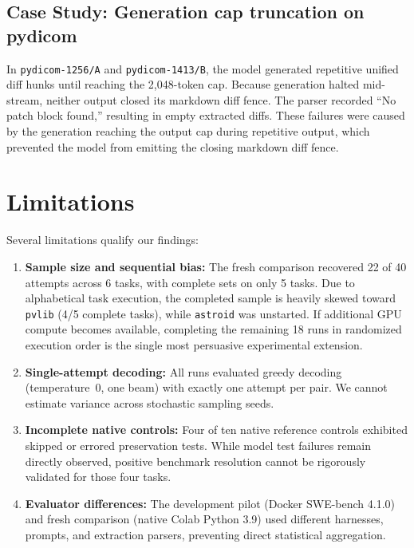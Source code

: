 \documentclass[11pt]{article}
\begin{document}
\subsection{Case Study: Generation cap truncation on pydicom}

In \texttt{pydicom-1256/A} and \texttt{pydicom-1413/B}, the model generated
repetitive unified diff hunks until reaching the 2{,}048-token cap.
Because generation halted mid-stream, neither output closed its markdown
diff fence.  The parser recorded ``No patch block found,'' resulting in
empty extracted diffs.  These failures were caused by the generation reaching
the output cap during repetitive output, which prevented the model from
emitting the closing markdown diff fence.

\section{Limitations}

Several limitations qualify our findings:
\begin{enumerate}[nosep]
  \item \textbf{Sample size and sequential bias:} The fresh comparison
    recovered 22 of 40 attempts across 6 tasks, with complete sets on only
    5 tasks.  Due to alphabetical task execution, the completed sample is
    heavily skewed toward \texttt{pvlib} (4/5 complete tasks), while
    \texttt{astroid} was unstarted.  If additional GPU compute becomes
    available, completing the remaining 18 runs in randomized execution order
    is the single most persuasive experimental extension.
  \item \textbf{Single-attempt decoding:} All runs evaluated greedy decoding
    (temperature~0, one beam) with exactly one attempt per pair.  We
    cannot estimate variance across stochastic sampling seeds.
  \item \textbf{Incomplete native controls:} Four of ten native reference
    controls exhibited skipped or errored preservation tests.  While model
    test failures remain directly observed, positive benchmark resolution
    cannot be rigorously validated for those four tasks.
  \item \textbf{Evaluator differences:} The development pilot (Docker
    SWE-bench 4.1.0) and fresh comparison (native Colab Python 3.9) used
    different harnesses, prompts, and extraction parsers, preventing direct
    statistical aggregation.
\end{enumerate}
\end{document}
